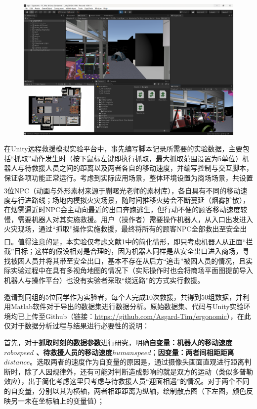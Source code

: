 \documentclass[12pt]{article}  %
\newcommand{\upcite}[1]{\textsuperscript{\textsuperscript{\cite{#1}}}}
\begin{document}
	\begin{figure}[H]
		\centering
		\includegraphics[width=1\textwidth]{2.png}
	\end{figure}
	
	在Unity远程救援模拟实验平台中，事先编写脚本记录所需要的实验数据，主要包括“抓取”动作发生时（按下鼠标左键即执行抓取，最大抓取范围设置为5单位）机器人与待救援人员之间的距离以及两者各自的移动速度，并编写控制与交互脚本，保证各项功能正常运行。考虑到实际应用场景，整体环境设置为商场场景，共设置3位NPC（动画与外形素材来源于蒯曙光老师的素材库\upcite{11}），各自具有不同的移动速度与行进路线；场地内模拟火灾场景，随时间推移火势会不断蔓延（烟雾扩散），在烟雾逼近时NPC会主动向最近的出口奔跑逃生，但行动不便的顾客移动速度较慢，需要机器人对其实施救援。用户（操作者）需要操作机器人，从入口出发进入火灾现场，通过“抓取”操作实施救援，最终将所有的顾客NPC全部救出至安全出口。值得注意的是，本实验仅考虑文献1\upcite{1}中的简化情形，即只考虑机器人从正面“拦截”目标；这样的假设相对是合理的，因为机器人同样是从安全出口进入商场，寻找被困人员并将其带至安全出口，基本不存在从后方“追击”被困人员的情况，且实际实验过程中在具有多视角地图的情况下（实际操作时也会将商场平面图提前导入机器人与操作平台）也没有实验者采取“绕远路”的方式实行救援。
	
	邀请到同组的5位同学作为实验者，每个人完成10次救援，共得到50组数据，并利用Matlab软件对于导出的数据集进行数据分析。原始数据集、代码与Unity实验环境均已上传至Github（链接：\href{https://github.com/Asgard-Tim/ergonomic}{https://github.com/Asgard-Tim/ergonomic}），在此仅对于数据分析过程与结果进行必要性的说明：
	
	首先，对于\textbf{抓取时刻的数据参数}进行研究，明确\textbf{自变量：机器人的移动速度$robospeed$ 、待救援人员的移动速度$humanspeed$}；\textbf{因变量：两者间相距距离$distance$}。选取两者的速度作为自变量的原因是，通过摄像头画面直观进行距离判断时，除了人因规律外，还有可能对判断造成影响的就是双方的运动（类似多普勒效应），出于简化考虑这里只考虑与待救援人员“迎面相遇”的情况。对于两个不同的自变量，分别以其为横轴，两者相距距离为纵轴，绘制散点图（下左图，颜色反映另一未在坐标轴上的变量值）；
	
\end{document}
